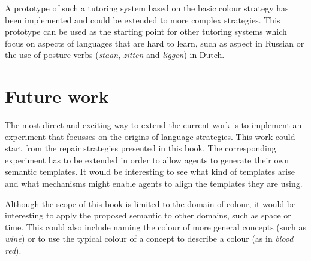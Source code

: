 A prototype of such a tutoring system based on the basic colour
  strategy has been implemented and could be extended to more complex
strategies. This prototype can be used as the starting point for  other tutoring
systems which focus on aspects of languages that are hard to learn,
such as aspect in Russian or the use of posture verbs (\textit{staan}, \textit{zitten} and
\textit{liggen}) in Dutch.

\section{Future work}
\label{s:future-work}

The most direct and exciting way to extend the current work is to
implement an experiment that focusses on the origins of language
strategies. This work could start from the repair strategies presented
in this book. The corresponding experiment has to be extended
in order to allow agents to generate their own semantic templates. 
It would be interesting to
see what kind of templates arise and what mechanisms might enable
agents to align the templates they are using.

Although the scope of this book is limited to the domain of colour,
it would be interesting to apply the proposed semantic to other
domains, such as space or time. This could also include naming the
colour of more general concepts (such as \emph{wine}) or to use the typical
colour of a concept to describe a colour (as in \textit{blood red}).